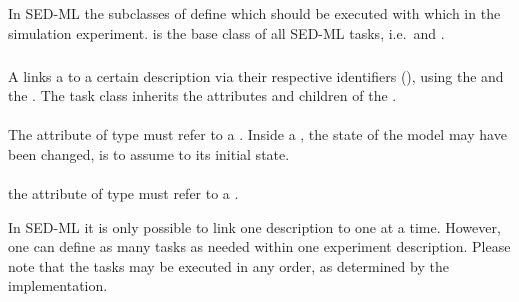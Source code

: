 \subsection{}
\label{class:abstractTask}
In SED-ML the subclasses of  define which \Simulations should be executed with which \Models in the simulation experiment.  is the base class of all SED-ML tasks, i.e.\ \Task and \RepeatedTask.  



\subsubsection{}
\label{class:task}

A  links a \Model to a certain \Simulation description via their respective identifiers (), using the \hyperref[sec:modelReference]{} and the \hyperref[sec:simulationReference]{}. The task class inherits the attributes and children of the \AbstractTask.

\paragraph*{}
The  attribute of type \SIdRef must refer to a \Model.  Inside a \RepeatedTask, the state of the model may have been changed,  \Model is to assume to its initial state.

\paragraph*{}
the  attribute of type \SIdRef must refer to a \Simulation.

In SED-ML it is only possible to link one \Simulation description to one \Model at a time. However, one can define as many tasks as needed within one experiment description. Please note that the tasks may be executed in any order, as determined by the implementation.


